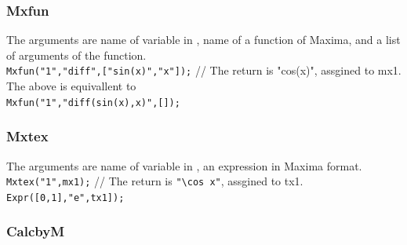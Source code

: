 \documentclass[papersize,a4paper,12pt]{article}
\begin{document}
\subsubsection*{Mxfun}

The arguments are name of variable in \ketcindy, name of a function of Maxima, and a list of arguments of the function.\\
\hspace*{10mm}\verb|Mxfun("1","diff",["sin(x)","x"]);|  // The return is "cos(x)", assgined to mx1.\\
The above is equivallent to\\
\hspace*{10mm}\verb|Mxfun("1","diff(sin(x),x)",[]);|


\subsubsection*{Mxtex}

The arguments are name of variable in \ketcindy, an expression in Maxima format.\\
\hspace*{10mm}\verb|Mxtex("1",mx1);|  // The return is \verb|"\cos x"|, assgined to tx1.\\
\hspace*{10mm}\verb|Expr([0,1],"e",tx1]);|

\begin{center}

\end{center}

\subsubsection*{CalcbyM}
\end{document}
